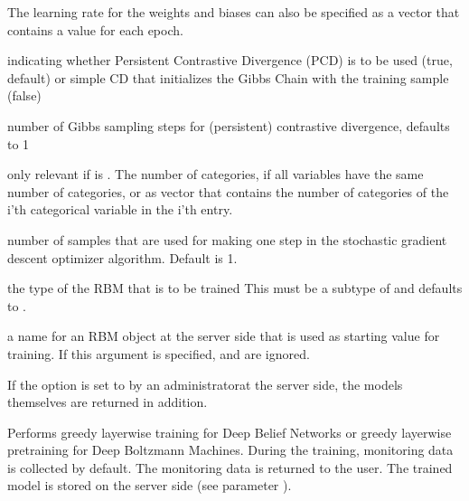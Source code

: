 \begin{Arguments}
\begin{ldescription}
\item[\code{learningrates}] The learning rate for the weights and biases
can also be specified as a vector that contains a value for each epoch.

\item[\code{pcd}] indicating whether Persistent Contrastive Divergence (PCD) is to
be used (true, default) or simple CD that initializes the Gibbs Chain with
the training sample (false)

\item[\code{cdsteps}] number of Gibbs sampling steps for (persistent)
contrastive divergence, defaults to 1

\item[\code{categories}] only relevant if  is .
The number of categories, if all variables have the same number
of categories, or as vector that contains the number of categories
of the i'th categorical variable in the i'th entry.

\item[\code{batchsize}] number of samples that are used for making one step in the
stochastic gradient descent optimizer algorithm. Default is 1.

\item[\code{rbmtype}] the type of the RBM that is to be trained
This must be a subtype of  and defaults to .

\item[\code{startrbm}] a name for an RBM object at the server side that
is used as starting value for training.
If this argument is specified,  and  are ignored.
\end{ldescription}
\end{Arguments}
%
\begin{Details}\relax
If the option  is set to 
by an administratorat the server side, the models themselves are returned in addition.
\end{Details}
%
\begin{Description}\relax
Performs greedy layerwise training for Deep Belief Networks or greedy layerwise
pretraining for Deep Boltzmann Machines.
During the training, monitoring data is collected by default.
The monitoring data is returned to the user.
The trained model is stored on the server side (see parameter ).
\end{Description}
